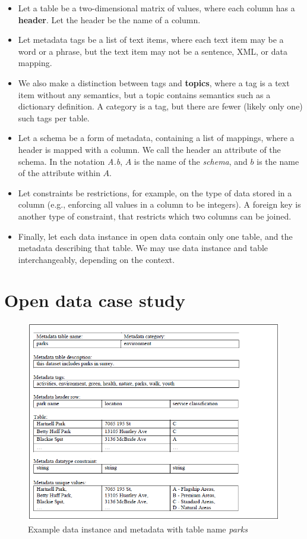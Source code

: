 \begin{itemize}
\item Let a table be a two-dimensional matrix of values, where each column has a \textbf{\gls{header}}. Let the header be the name of a column.
\item Let metadata tags be a list of text items, where each text item may be a word or a phrase, but the text item may not be a sentence, XML, or data mapping.
\item We also make a distinction between tags and \textbf{\glspl{topic}}, where a tag is a text item without any semantics, but a topic contains semantics such as a dictionary definition. A category is a tag, but there are fewer (likely only one) such tags per table.
\item Let a schema be a form of metadata, containing a list of mappings, where a header is mapped with a column. We call the header an attribute of the schema. In the notation \textit{A.b}, $A$ is the name of the \textit{schema}, and $b$ is the name of the attribute within $A$.
\item Let constraints be restrictions, for example, on the type of data stored in a column (e.g., enforcing all values in a column to be integers). A foreign key is another type of constraint, that restricts which two columns can be joined.
\item Finally, let each data instance in open data contain only one table, and the metadata describing that table. We may use data instance and table interchangeably, depending on the context.
\end{itemize}

\section{Open data case study}
\label{sec:OpenDataCaseStudy}

\begin{figure}
    \centering
    \includegraphics[width=5in]{figures/example-parks.png}
    \caption{Example data instance and metadata with table name \textit{parks}}
    \label{fig:example-parks}
\end{figure}

